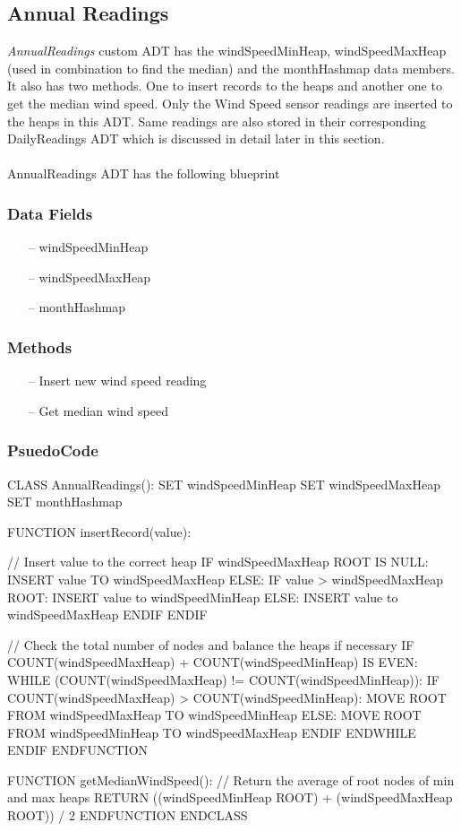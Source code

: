 \documentclass[12pt]{article}
\begin{document}
\subsection{Annual Readings}
{\em AnnualReadings} custom ADT has the windSpeedMinHeap, windSpeedMaxHeap (used in combination to find the median) and the monthHashmap data members. It also has two methods. One to insert records to the heaps and another one to get the median wind speed. Only the Wind Speed sensor readings are inserted to the heaps in this ADT. Same readings are also stored in their corresponding DailyReadings ADT which is discussed in detail later in this section.
\paragraph{}AnnualReadings ADT has the following blueprint
\subsubsection{Data Fields}
\begin{enumerate}
	\item [--]windSpeedMinHeap
	\item [--]windSpeedMaxHeap
	\item [--]monthHashmap
\end{enumerate}
\subsubsection{Methods}
\begin{enumerate}
	\item [--]Insert new wind speed reading
	\item [--]Get median wind speed
\end{enumerate}
\subsubsection{PsuedoCode}
\begin{algorithm}[caption={Blueprint of annualReadings ADT}, label=subalgo1]
CLASS AnnualReadings():
	SET windSpeedMinHeap
	SET windSpeedMaxHeap
	SET monthHashmap

	FUNCTION insertRecord(value):
	
		// Insert value to the correct heap
		IF windSpeedMaxHeap ROOT IS NULL:
			INSERT value TO windSpeedMaxHeap
		ELSE:
			IF value > windSpeedMaxHeap ROOT:
				INSERT value to windSpeedMinHeap
			ELSE:
				INSERT value to windSpeedMaxHeap
			ENDIF
		ENDIF
		
		// Check the total number of nodes and balance the heaps if necessary
		IF COUNT(windSpeedMaxHeap) + COUNT(windSpeedMinHeap) IS EVEN:
			WHILE (COUNT(windSpeedMaxHeap) != COUNT(windSpeedMinHeap)):
				IF COUNT(windSpeedMaxHeap) > COUNT(windSpeedMinHeap):
					MOVE ROOT FROM windSpeedMaxHeap TO windSpeedMinHeap
				ELSE:
					MOVE ROOT FROM windSpeedMinHeap TO windSpeedMaxHeap
				ENDIF
			ENDWHILE
		ENDIF
	ENDFUNCTION
	
	FUNCTION getMedianWindSpeed():
		// Return the average of root nodes of min and max heaps
		RETURN ((windSpeedMinHeap ROOT) + (windSpeedMaxHeap ROOT)) / 2
	ENDFUNCTION
ENDCLASS
\end{algorithm}
\end{document}
